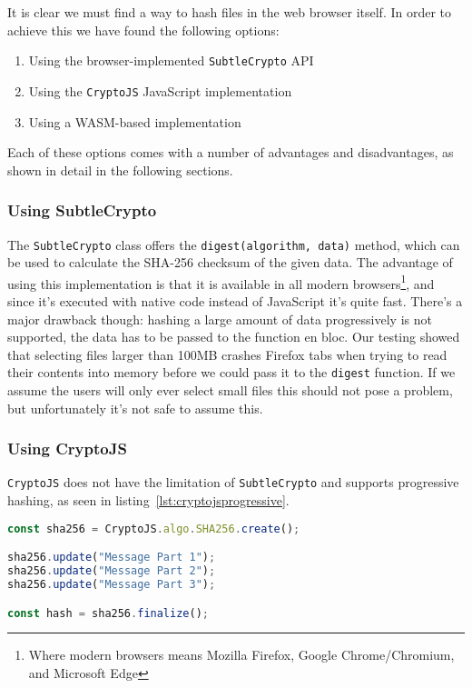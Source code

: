 It is clear we must find a way to hash files in the web browser itself.
In order to achieve this we have found the following options:

\begin{enumerate}
    \item Using the browser-implemented \texttt{SubtleCrypto}\cite{subtlecrypto} \gls{API}
    \item Using the \texttt{CryptoJS}\cite{cryptojs} JavaScript implementation
    \item Using a \gls{WASM}-based implementation
\end{enumerate}

Each of these options comes with a number of advantages and disadvantages, as shown in detail in the following sections.

\subsubsection{Using SubtleCrypto}
\label{subsubsec:subtlecrypto}
The \texttt{SubtleCrypto} class offers the \texttt{digest(algorithm, data)} method, which can be used to
calculate the \gls{SHA-256} checksum of the given data.
The advantage of using this implementation is that it is available in all modern browsers\footnote{Where modern browsers means Mozilla Firefox, Google Chrome/Chromium, and Microsoft Edge},
and since it's executed with native code instead of JavaScript it's quite fast.
There's a major drawback though: hashing a large amount of data progressively is not supported, the data has to be
passed to the function en bloc.
Our testing showed that selecting files larger than 100MB crashes Firefox tabs when trying to read their contents
into memory before we could pass it to the \texttt{digest} function.
If we assume the users will only ever select small files this should not pose a problem, but unfortunately it's not safe to assume this.

\subsubsection{Using CryptoJS}
\label{subsubsec:cryptojs}
\texttt{CryptoJS} does not have the limitation of \texttt{SubtleCrypto} and supports progressive hashing,
as seen in listing~\ref{lst:cryptojsprogressive}.

\begin{lstlisting}[caption={Progressive SHA-256 hashing using CryptoJS},captionpos=b,language=JavaScript,label={lst:cryptojsprogressive}]
const sha256 = CryptoJS.algo.SHA256.create();

sha256.update("Message Part 1");
sha256.update("Message Part 2");
sha256.update("Message Part 3");

const hash = sha256.finalize();
\end{lstlisting}











